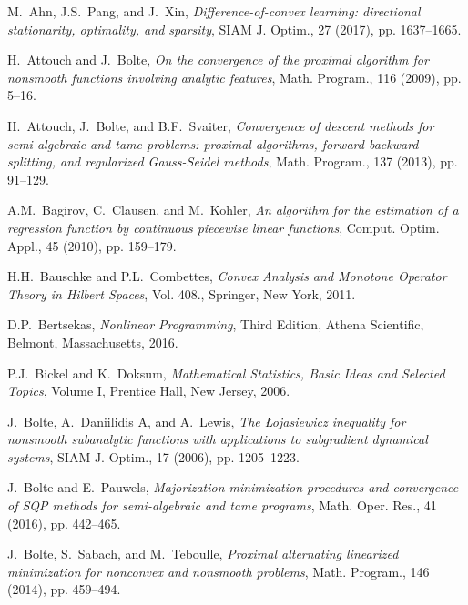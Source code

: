 \documentclass{siamart}
\begin{document}
\begin{thebibliography}{999}
{
{\sc M.\ Ahn, J.S.\ Pang, and J.\ Xin},
{\sl Difference-of-convex learning: directional stationarity, optimality, and sparsity},
SIAM J. Optim., 27 (2017), pp. 1637--1665.


{\sc H.\ Attouch and J.\ Bolte},
{\sl  On the convergence of the proximal algorithm for nonsmooth functions involving analytic features},
Math. Program., 116 (2009), pp. 5--16.

{\sc H.\ Attouch, J.\ Bolte, and B.F.\ Svaiter},
{\sl Convergence of descent methods for semi-algebraic and tame problems: proximal algorithms, forward-backward splitting, and regularized Gauss-Seidel methods},
Math. Program., 137 (2013), pp. 91--129.

{\sc A.M.\ Bagirov, C.\ Clausen, and M.\ Kohler}, 
{\sl An algorithm for the estimation of a regression function by continuous piecewise linear functions},
Comput. Optim. Appl., 45 (2010), pp. 159--179.


{\sc H.H.\ Bauschke and P.L.\ Combettes},
{\sl Convex Analysis and Monotone Operator Theory in Hilbert Spaces},
Vol. 408., Springer, New York, 2011.

{\sc D.P.\ Bertsekas},
{\sl Nonlinear Programming},  Third Edition,
Athena Scientific, Belmont, Massachusetts, 2016.

{\sc P.J.\ Bickel and K.\ Doksum},
{\sl Mathematical Statistics, Basic Ideas and Selected Topics},
Volume I, Prentice Hall, New Jersey, 2006.


{\sc J.\ Bolte,  A.\ Daniilidis A, and A.\ Lewis},
{\sl The {\L}ojasiewicz inequality for nonsmooth subanalytic functions with applications to subgradient dynamical systems},
SIAM J. Optim.,  17 (2006),  pp. 1205--1223.


{\sc J.\ Bolte and E.\ Pauwels},
{\sl  Majorization-minimization procedures and convergence of SQP methods for semi-algebraic and tame programs},
 Math. Oper. Res., 41 (2016), pp. 442--465.

{\sc J.\ Bolte, S.\ Sabach, and M.\ Teboulle},
{\sl Proximal alternating linearized minimization for nonconvex and nonsmooth problems},
Math. Program., 146 (2014), pp. 459--494.


}
\end{thebibliography}
\end{document}
